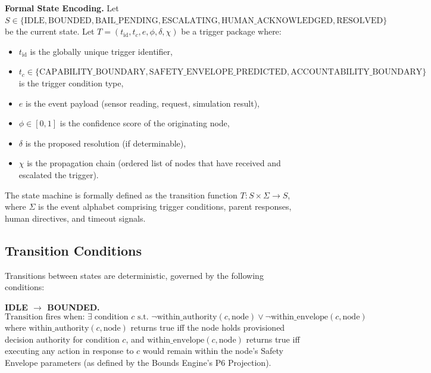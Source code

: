 \bigskip
\noindent\textbf{Formal State Encoding.} Let $S \in \{\text{IDLE}, \text{BOUNDED}, \text{BAIL\_PENDING}, \text{ESCALATING}, \text{HUMAN\_ACKNOWLEDGED}, \text{RESOLVED}\}$ be the current state. Let $T = (t_{\text{id}}, t_c, e, \phi, \delta, \chi)$ be a trigger package where:

\begin{itemize}
    \item $t_{\text{id}}$ is the globally unique trigger identifier,
    \item $t_c \in \{\text{CAPABILITY\_BOUNDARY}, \text{SAFETY\_ENVELOPE\_PREDICTED}, \text{ACCOUNTABILITY\_BOUNDARY}\}$ is the trigger condition type,
    \item $e$ is the event payload (sensor reading, request, simulation result),
    \item $\phi \in [0,1]$ is the confidence score of the originating node,
    \item $\delta$ is the proposed resolution (if determinable),
    \item $\chi$ is the propagation chain (ordered list of nodes that have received and escalated the trigger).
\end{itemize}

The state machine is formally defined as the transition function $T: S \times \Sigma \rightarrow S$, where $\Sigma$ is the event alphabet comprising trigger conditions, parent responses, human directives, and timeout signals.

\subsection{Transition Conditions}

Transitions between states are deterministic, governed by the following conditions:

\bigskip
\noindent\textbf{IDLE $\rightarrow$ BOUNDED.}
\begin{equation}
\text{Transition fires when: } \exists\; \text{condition } c \text{ s.t. } \neg \text{within\_authority}(c, \text{node}) \lor \neg \text{within\_envelope}(c, \text{node})
\end{equation}
where $\text{within\_authority}(c, \text{node})$ returns true iff the node holds provisioned decision authority for condition $c$, and $\text{within\_envelope}(c, \text{node})$ returns true iff executing any action in response to $c$ would remain within the node's Safety Envelope parameters (as defined by the Bounds Engine's P6 Projection).

